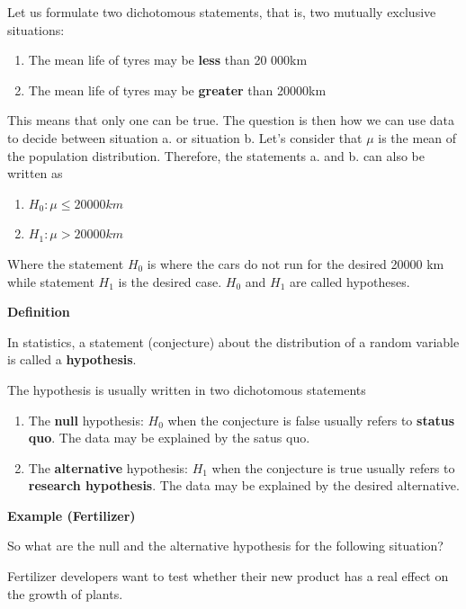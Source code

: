 \documentclass[
]{book}
\providecommand{\tightlist}{%
  \setlength{\itemsep}{0pt}\setlength{\parskip}{0pt}}
\begin{document}
Let us formulate two dichotomous statements, that is, two mutually exclusive situations:

\begin{enumerate}
\def\labelenumi{\alph{enumi}.}
\tightlist
\item
  The mean life of tyres may be \textbf{less} than 20 000km
\item
  The mean life of tyres may be \textbf{greater} than 20000km
\end{enumerate}

This means that only one can be true. The question is then how we can use data to decide between situation a. or situation b. Let's consider that \(\mu\) is the mean of the population distribution. Therefore, the statements a. and b. can also be written as

\begin{enumerate}
\def\labelenumi{\alph{enumi}.}
\tightlist
\item
  \(H_0: \mu \leq 20000km\)
\item
  \(H_1: \mu > 20000km\)
\end{enumerate}

Where the statement \(H_0\) is where the cars do not run for the desired 20000 km while statement \(H_1\) is the desired case. \(H_0\) and \(H_1\) are called hypotheses.

\textbf{Definition}

In statistics, a statement (conjecture) about the distribution of a random variable is called a \textbf{hypothesis}.

The hypothesis is usually written in two dichotomous statements

\begin{enumerate}
\def\labelenumi{\alph{enumi}.}
\item
  The \textbf{null} hypothesis: \(H_0\) when the conjecture is false usually refers to \textbf{status quo}. The data may be explained by the satus quo.
\item
  The \textbf{alternative} hypothesis: \(H_1\) when the conjecture is true usually refers to \textbf{research hypothesis}. The data may be explained by the desired alternative.
\end{enumerate}

\textbf{Example (Fertilizer)}

So what are the null and the alternative hypothesis for the following situation?

Fertilizer developers want to test whether their new product has a real effect on the growth of plants.
\end{document}
